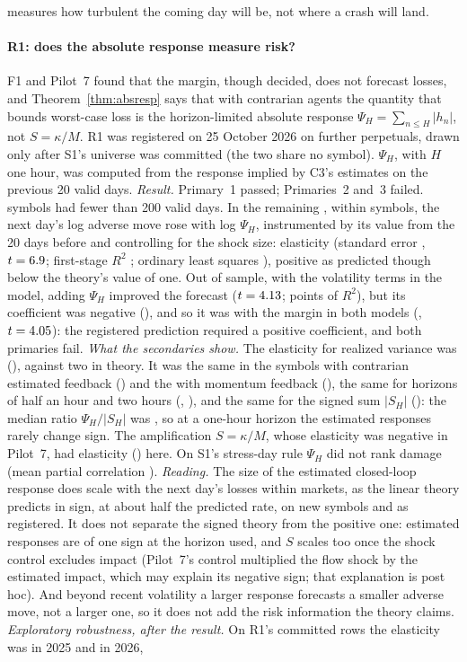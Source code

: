 measures how turbulent the coming day will be, not where a crash will land.

\paragraph{R1: does the absolute response measure risk?} F1 and Pilot~7 found that the margin, though decided, does not forecast losses, and Theorem~\ref{thm:absresp} says that with contrarian agents the quantity that bounds worst-case loss is the horizon-limited absolute response $\Psi_H=\sum_{n\le H}|h_n|$, not $S=\kappa/M$. R1 was registered on 25 October 2026 on \RoneDrawn{} further perpetuals, drawn only after S1's universe was committed (the two share no symbol). $\Psi_H$, with $H$ one hour, was computed from the response implied by C3's estimates on the previous 20 valid days. \emph{Result.} Primary~1 passed; Primaries~2 and~3 failed. \RoneExcluded{} symbols had fewer than 200 valid days. In the remaining \RoneSymbols{}, within symbols, the next day's log adverse move rose with log $\Psi_H$, instrumented by its value from the 20 days before and controlling for the shock size: elasticity \RoneElast{} (standard error \RoneElastSE{}, $t=6.9$; first-stage $R^2$ \RoneFS{}; ordinary least squares \RoneOLS{}), positive as predicted though below the theory's value of one. Out of sample, with the volatility terms in the model, adding $\Psi_H$ improved the forecast ($t=4.13$; \RoneGain{} points of $R^2$), but its coefficient was negative (\RoneFcCoef{}), and so it was with the margin in both models (\RoneBeyondCoef{}, $t=4.05$): the registered prediction required a positive coefficient, and both primaries fail. \emph{What the secondaries show.} The elasticity for realized variance was \RoneRv{} (\RoneRvSE{}), against two in theory. It was the same in the \RoneNContr{} symbols with contrarian estimated feedback (\RoneContr) and the \RoneNMom{} with momentum feedback (\RoneMom), the same for horizons of half an hour and two hours (\RoneHsix{}, \RoneHtwentyfour{}), and the same for the signed sum $|S_H|$ (\RoneLogSH{}): the median ratio $\Psi_H/|S_H|$ was \RoneRatio{}, so at a one-hour horizon the estimated responses rarely change sign. The amplification $S=\kappa/M$, whose elasticity was negative in Pilot~7, had elasticity \RoneLogS{} (\RoneLogSSE) here. On S1's stress-day rule $\Psi_H$ did not rank damage (mean partial correlation \RoneStressRho). \emph{Reading.} The size of the estimated closed-loop response does scale with the next day's losses within markets, as the linear theory predicts in sign, at about half the predicted rate, on new symbols and as registered. It does not separate the signed theory from the positive one: estimated responses are of one sign at the horizon used, and $S$ scales too once the shock control excludes impact (Pilot~7's control multiplied the flow shock by the estimated impact, which may explain its negative sign; that explanation is post hoc). And beyond recent volatility a larger response forecasts a smaller adverse move, not a larger one, so it does not add the risk information the theory claims. \emph{Exploratory robustness, after the result.} On R1's committed rows the elasticity was \RobRYrAE{} in 2025 and \RobRYrBE{} in 2026, 